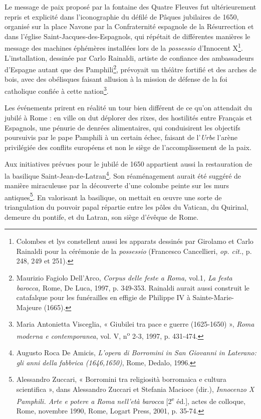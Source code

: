 \documentclass[12pt,twoside,openany]{book}
\begin{document}
Le message de paix proposé par la fontaine des Quatre Fleuves fut ultérieurement repris et explicité dans l’iconographie du défilé de Pâques jubilaires de 1650, organisé sur la place Navone par la Confraternité espagnole de la Résurrection et dans l’église Saint-Jacques-des-Espagnols, qui répétait de différentes manières le message des machines éphémères installées lors de la \textit{possessio} d’Innocent X\footnote{Colombes et lys constellent aussi les apparats dessinés par Girolamo et Carlo Rainaldi pour la cérémonie de la \textit{possessio} (Francesco Cancellieri, \textit{op. cit.}, p. 248, 249 et 251).}. L’installation, dessinée par Carlo Rainaldi, artiste de confiance des ambassadeurs d’Espagne autant que des Pamphili\footnote{Maurizio Fagiolo Dell’Arco, \textit{Corpus delle feste a Roma, }vol.1\textit{, La festa barocca, }Rome, De Luca, 1997, p. 349-353. Rainaldi aurait aussi construit le catafalque pour les funérailles en effigie de Philippe IV à Sainte-Marie-Majeure (1665).}, prévoyait un théâtre fortifié et des arches de bois, avec des obélisques faisant allusion à la mission de défense de la foi catholique confiée à cette nation\footnote{Maria Antonietta Visceglia, « Giubilei tra pace e guerre (1625-1650) », \textit{Roma moderna e contemporanea}, vol. V, n\textsuperscript{o} 2-3, 1997, p. 431-474.}.

Les événements prirent en réalité un tour bien différent de ce qu’on attendait du jubilé à Rome : en ville on dut déplorer des rixes, des hostilités entre Français et Espagnols, une pénurie de denrées alimentaires, qui conduisirent les objectifs poursuivis par le pape Pamphili à un certain échec, faisant de l’\textit{Urbe} l’arène privilégiée des conflits européens et non le siège de l’accomplissement de la paix.

Aux initiatives prévues pour le jubilé de 1650 appartient aussi la restauration de la basilique Saint-Jean-de-Latran\footnote{Augusto Roca De Amicis, \textit{L’opera di Borromini in San Giovanni in Laterano: gli anni della fabbrica (1646,1650)}, Rome, Dedalo, 1996.}. Son réaménagement aurait été suggéré de manière miraculeuse par la découverte d’une colombe peinte sur les murs antiques\footnote{Alessandro Zuccari, « Borromini tra religiosità borromaica e cultura scientifica », dans Alessandro Zuccari et Stefania Macioce (dir.), \textit{Innocenzo X Pamphili. Arte e potere a Roma nell’età barocca }[2\textsuperscript{e} éd.], actes de colloque, Rome, novembre 1990, Rome, Logart Press, 2001, p. 35-74.}. En valorisant la basilique, on mettait en œuvre une sorte de triangulation du pouvoir papal répartie entre les pôles du Vatican, du Quirinal, demeure du pontife, et du Latran, son siège d’évêque de Rome.
\end{document}
